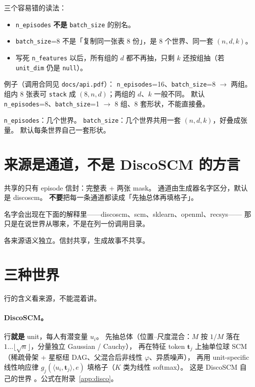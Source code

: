 \documentclass[11pt,a4paper,fontset=none]{ctexart}
\newcommand{\Disco}{\textsf{DiscoSCM}}
\begin{document}
三个容易错的读法：
\begin{itemize}
  \item \texttt{n\_episodes} \textbf{不是} \texttt{batch\_size} 的别名。
  \item \texttt{batch\_size}=8 不是「复制同一张表 8 份」，是 8 个世界、同一套 $(n,d,k)$。
  \item 写死 \texttt{n\_features} 以后，所有组的 $d$ 都不再抽，只剩 $k$ 还按组抽（若 \texttt{unit\_dim} 仍是 \texttt{null}）。
\end{itemize}

例子（调用合同见 \texttt{docs/api.pdf}）：
\texttt{n\_episodes}=16、\texttt{batch\_size}=8
$\to$ 两组。组内 8 张表可 \texttt{stack} 成 $(8,n,d)$；两组的 $d$、$k$ 一般不同。
默认 \texttt{n\_episodes}=8、\texttt{batch\_size}=1
$\to$ 8 组、8 套形状，不能直接叠。

\begin{lockbox}
\texttt{n\_episodes}：几个世界。
\texttt{batch\_size}：几个世界共用一套 $(n,d,k)$，好叠成张量。
默认每条世界自己一套形状。
\end{lockbox}

\section{来源是通道，不是 DiscoSCM 的方言}

共享的只有 episode 信封：完整表 + 两张 mask。
通道由生成器名字区分，默认是 discoscm。
\textbf{不要}把每一条通道都读成「先抽总体再填格子」。

名字会出现在下面的解释里——discoscm、scm、sklearn、openml、recsys——
那只是在说世界从哪来，不是在列一份调用目录。

\begin{lockbox}
各来源语义独立。信封共享，生成故事不共享。
\end{lockbox}

\section{三种世界}

行的含义看来源，不能混着讲。

\paragraph{DiscoSCM。}
行\textbf{就是} unit，每人有潜变量 $u_i$。
先抽总体（位置--尺度混合：$M$ 按 $1/M$ 落在 $1\ldots\lfloor\sqrt{n}\rfloor$，分量独立 Gaussian / Cauchy），
再在特征 token $\mathbf{t}_j$ 上抽单位球 SCM
（稀疏骨架 + 星枢纽 DAG、父混合后非线性 $\varphi$、异质噪声），
再用 unit-specific 线性响应律 $g_j(\langle u_i,\mathbf{t}_j\rangle, e)$ 填格子（$K$ 类为线性 softmax）。
这是 \Disco{} 自己的世界 \cite{gong2024discoscm}。公式在附录~\ref{app:disco}。
\end{document}
